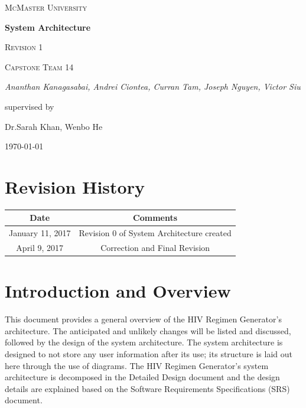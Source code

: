 \documentclass[12pt]{article}
\begin{document}
\begin{titlepage}
	\centering
	{\scshape\LARGE McMaster University \par}
	\vspace{1.5cm}
	{\huge\bfseries System Architecture  \par}
    {\scshape\Large Revision 1 \par}

	\vspace{1cm}
	{\scshape\Large Capstone Team 14\par}
	{\Large\itshape Ananthan Kanagasabai, Andrei Ciontea, Curran Tam, Joseph Nguyen, Victor Siu \par}
	\vspace{3cm}
	\vfill
	supervised by\par
	Dr.Sarah Khan, Wenbo He

	\vfill
	{\large \today\par}
\end{titlepage}

\newpage

\tableofcontents
\listoffigures

\section*{Revision History}
\begin{tabular}{|c|c|}
\hline
\textbf{Date}  & \textbf{Comments} \\ \hline
January 11, 2017 & Revision 0 of System Architecture created\\  \hline
April 9, 2017 & Correction and Final Revision\\ \hline
\end{tabular}

\newpage


\section{Introduction and Overview}
This document provides a general overview of the HIV Regimen Generator’s architecture. The anticipated and unlikely changes will be listed and discussed, followed by the design of the system architecture. The system architecture is designed to not store any user information after its use; its structure is laid out here through the use of diagrams. The HIV Regimen Generator’s system architecture is decomposed in the Detailed Design document and the design details are explained based on the Software Requirements Specifications (SRS) document.
\end{document}
